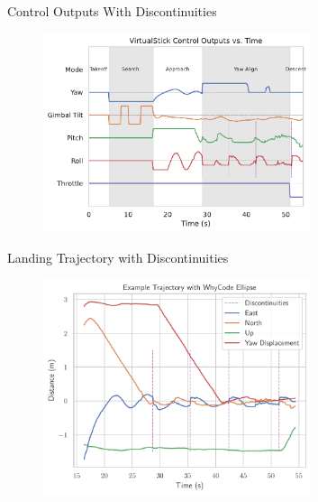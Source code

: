 \documentclass[aspectratio=169]{beamer}
\begin{document}
\begin{frame}{Control Outputs With Discontinuities}
	\begin{figure}
		\centering
		\includegraphics[width=0.7\textwidth]{./images/control_example_with_discontinuities}
	\end{figure}
\end{frame}

\begin{frame}{Landing Trajectory with Discontinuities}
	\begin{figure}
		\centering
		\includegraphics[width=0.7\textwidth]{./images/landing_trajectory_with_discontinuities}
	\end{figure}
\end{frame}
\end{document}
